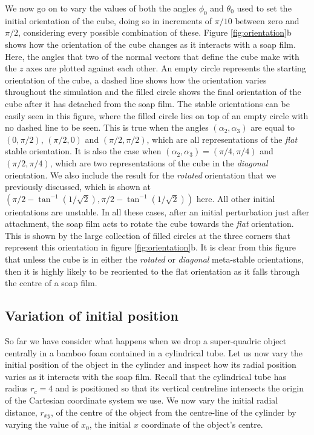 \documentclass[preprint]{revtex4-1}
\begin{document}
We now go on to vary the values of both the angles $\phi_0$ and $\theta_0$ used to set the initial orientation of the cube, doing so in increments of $\pi/10$ between zero and $\pi/2$, considering every possible combination of these. Figure \ref{fig:orientation}b shows how the orientation of the cube changes as it interacts with a soap film. Here, the angles that two of the normal vectors that define the cube make with the $z$ axes are plotted against each other. An empty circle represents the starting orientation of the cube, a dashed line shows how the orientation varies throughout the simulation and the filled circle shows the final orientation of the cube after it has detached from the soap film. The stable orientations can be easily seen in this figure, where the filled circle lies on top of an empty circle with no dashed line to be seen. This is true when the angles $(\alpha_2,\alpha_3)$ are equal to $\left(0,\pi/2\right)$, $\left(\pi/2,0\right)$ and $\left(\pi/2,\pi/2\right)$, which are all representations of the \emph{flat} stable orientation. It is also the case when $(\alpha_2,\alpha_3)=\left(\pi/4,\pi/4\right)$ and $\left(\pi/2,\pi/4\right)$, which are two representations of the cube in the \emph{diagonal} orientation. We also include the result for the \emph{rotated} orientation that we previously discussed, which is shown at $\left(\pi/2-\tan^{-1}\left(1/\sqrt{2}\right),\pi/2-\tan^{-1}\left(1/\sqrt{2}\right)\right)$ here. All other initial orientations are unstable. In all these cases, after an initial perturbation just after attachment, the soap film acts to rotate the cube towards the \emph{flat} orientation. This is shown by the large collection of filled circles at the three corners that represent this orientation in figure \ref{fig:orientation}b. It is clear from this figure that unless the cube is in either the \emph{rotated} or \emph{diagonal} meta-stable orientations, then it is highly likely to be reoriented to the flat orientation as it falls through the centre of a soap film. 


\subsection{Variation of initial position}
	\label{sec:position}



So far we have consider what happens when we drop a super-quadric object centrally in a bamboo foam contained in a cylindrical tube. Let us now vary the initial position of the object in the cylinder and inspect how its radial position varies as it interacts with the soap film. Recall that the cylindrical tube has radius $r_c=4$ and is positioned so that its vertical centreline intersects the origin of the Cartesian coordinate system we use. We now vary the initial radial distance, $r_{xy}$, of the centre of the object from the centre-line of the cylinder by varying the value of $x_0$, the initial $x$ coordinate of the object's centre. 
\end{document}
